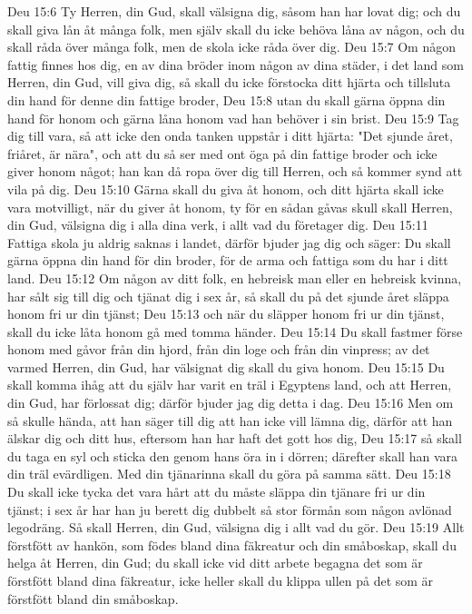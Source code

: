 Deu 15:6  Ty Herren, din Gud, skall välsigna dig, såsom han har lovat dig; och du skall giva lån åt många folk, men själv skall du icke behöva låna av någon, och du skall råda över många folk, men de skola icke råda över dig.
Deu 15:7  Om någon fattig finnes hos dig, en av dina bröder inom någon av dina städer, i det land som Herren, din Gud, vill giva dig, så skall du icke förstocka ditt hjärta och tillsluta din hand för denne din fattige broder,
Deu 15:8  utan du skall gärna öppna din hand för honom och gärna låna honom vad han behöver i sin brist.
Deu 15:9  Tag dig till vara, så att icke den onda tanken uppstår i ditt hjärta: "Det sjunde året, friåret, är nära", och att du så ser med ont öga på din fattige broder och icke giver honom något; han kan då ropa över dig till Herren, och så kommer synd att vila på dig.
Deu 15:10  Gärna skall du giva åt honom, och ditt hjärta skall icke vara motvilligt, när du giver åt honom, ty för en sådan gåvas skull skall Herren, din Gud, välsigna dig i alla dina verk, i allt vad du företager dig.
Deu 15:11  Fattiga skola ju aldrig saknas i landet, därför bjuder jag dig och säger: Du skall gärna öppna din hand för din broder, för de arma och fattiga som du har i ditt land.
Deu 15:12  Om någon av ditt folk, en hebreisk man eller en hebreisk kvinna, har sålt sig till dig och tjänat dig i sex år, så skall du på det sjunde året släppa honom fri ur din tjänst;
Deu 15:13  och när du släpper honom fri ur din tjänst, skall du icke låta honom gå med tomma händer.
Deu 15:14  Du skall fastmer förse honom med gåvor från din hjord, från din loge och från din vinpress; av det varmed Herren, din Gud, har välsignat dig skall du giva honom.
Deu 15:15  Du skall komma ihåg att du själv har varit en träl i Egyptens land, och att Herren, din Gud, har förlossat dig; därför bjuder jag dig detta i dag.
Deu 15:16  Men om så skulle hända, att han säger till dig att han icke vill lämna dig, därför att han älskar dig och ditt hus, eftersom han har haft det gott hos dig,
Deu 15:17  så skall du taga en syl och sticka den genom hans öra in i dörren; därefter skall han vara din träl evärdligen. Med din tjänarinna skall du göra på samma sätt.
Deu 15:18  Du skall icke tycka det vara hårt att du måste släppa din tjänare fri ur din tjänst; i sex år har han ju berett dig dubbelt så stor förmån som någon avlönad legodräng. Så skall Herren, din Gud, välsigna dig i allt vad du gör.
Deu 15:19  Allt förstfött av hankön, som födes bland dina fäkreatur och din småboskap, skall du helga åt Herren, din Gud; du skall icke vid ditt arbete begagna det som är förstfött bland dina fäkreatur, icke heller skall du klippa ullen på det som är förstfött bland din småboskap.
